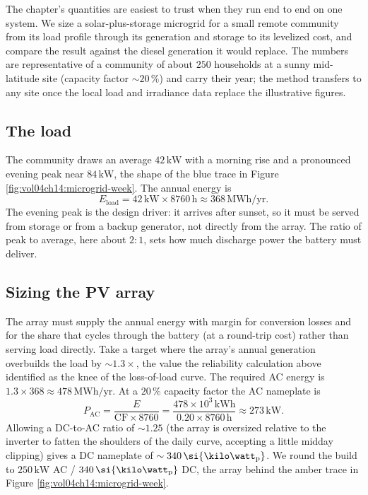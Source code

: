 The chapter's quantities are easiest to trust when they run end to end on
one system. We size a solar-plus-storage microgrid for a small remote
community from its load profile through its generation and storage to its
levelized cost, and compare the result against the diesel generation it
would replace. The numbers are representative of a community of about
$250$ households at a sunny mid-latitude site (capacity factor $\sim
20\,\%$) and carry their year; the method transfers to any site once the
local load and irradiance data replace the illustrative figures.

\subsection{The load}

The community draws an average $42\,\si{\kilo\watt}$ with a morning rise
and a pronounced evening peak near $84\,\si{\kilo\watt}$, the shape of the
blue trace in Figure \ref{fig:vol04ch14:microgrid-week}. The annual energy
is
\[
E_{\text{load}} = 42\,\si{\kilo\watt}\times 8760\,\si{\hour}
\approx 368\,\si{\mega\watt\hour}/\text{yr}.
\]
The evening peak is the design driver: it arrives after sunset, so it must
be served from storage or from a backup generator, not directly from the
array. The ratio of peak to average, here about $2{:}1$, sets how much
discharge power the battery must deliver.

\subsection{Sizing the PV array}

The array must supply the annual energy with margin for conversion losses
and for the share that cycles through the battery (at a round-trip cost)
rather than serving load directly. Take a target where the array's annual
generation overbuilds the load by $\sim 1.3\times$, the value the
reliability calculation above identified as the knee of the
loss-of-load curve. The required AC energy is $1.3\times 368 \approx
478\,\si{\mega\watt\hour}/\text{yr}$. At a $20\,\%$ capacity factor the AC
nameplate is
\[
P_{\text{AC}} = \frac{E}{\text{CF}\times 8760}
= \frac{478\times 10^3\,\si{\kilo\watt\hour}}{0.20\times 8760\,\si{\hour}}
\approx 273\,\si{\kilo\watt}.
\]
Allowing a DC-to-AC ratio of $\sim 1.25$ (the array is oversized relative
to the inverter to fatten the shoulders of the daily curve, accepting a
little midday clipping) gives a DC nameplate of $\sim 340\,\si{\kilo\watt
\textsubscript{p}}$. We round the build to $250\,\si{\kilo\watt}$ AC /
$340\,\si{\kilo\watt\textsubscript{p}}$ DC, the array behind the amber
trace in Figure \ref{fig:vol04ch14:microgrid-week}.

